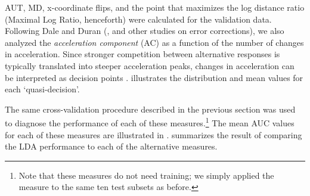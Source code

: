 \documentclass{article}
\newcommand{\addMM}[1]{{\leavevmode\color{red}#1}}
\begin{document}
AUT, MD, x-coordinate flips, and the point that maximizes the log distance ratio (Maximal Log Ratio, henceforth) were calculated for the validation data. 
Following Dale and Duran (\citeyear{Dale2011}, and other studies on error corrections), we also analyzed the \emph{acceleration component} (AC) as a function of the number of changes in acceleration.
Since stronger competition between alternative responses is typically translated into steeper acceleration peaks, changes in acceleration can be interpreted as decision points \citep{Hehman2014}.   
 illustrates the distribution and mean values for each `quasi-decision'.

The same cross-validation procedure described in the previous section was used to diagnose the performance of each of these measures.\footnote{Note that these measures do not need training; we simply applied the measure to the same ten test subsets as before.} The mean AUC values for each of these measures are illustrated in .  summarizes the result of comparing the LDA performance to each of the alternative measures. 
\end{document}
